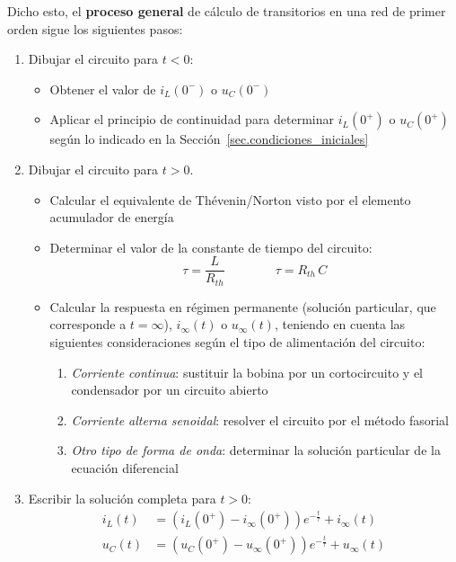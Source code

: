 \documentclass[11pt]{book} %
\begin{document}
	Dicho esto, el \textbf{proceso general} de cálculo de transitorios en una red de primer orden sigue los siguientes pasos:
	\begin{enumerate}
	\item Dibujar el circuito para $t < 0$:
        \begin{itemize}
        \item Obtener el valor de $i_L(0^-)$ o $u_C(0^-)$
        \item Aplicar el principio de continuidad para determinar $i_L(0^+)$ o $u_C(0^+)$ según lo indicado en la Sección~\ref{sec.condiciones_iniciales}
        \end{itemize}
    \item Dibujar el circuito para \(t > 0\).
        \begin{itemize}
        \item Calcular el equivalente de Thévenin/Norton visto por el elemento acumulador de energía
        \item Determinar el valor de la constante de tiempo del circuito:
        \begin{equation*}
            \tau = \dfrac{L}{R_{th}} \qquad\qquad \tau = R_{th}\,{C}
        \end{equation*}
        \item Calcular la respuesta en régimen permanente (solución particular, que corresponde a $t=\infty$), $i_\infty(t)$ o $u_\infty(t)$, teniendo en cuenta las siguientes consideraciones según el tipo de alimentación del circuito:
        \begin{enumerate}
	        \item \textit{Corriente continua}: sustituir la bobina por un cortocircuito y el condensador por un circuito abierto
	        \item \textit{Corriente alterna senoidal}: resolver el circuito por el método fasorial
	        \item \textit{Otro tipo de forma de onda}: determinar la solución particular de la ecuación diferencial
	    \end{enumerate}
        \end{itemize}
    \item Escribir la solución completa para $t>0$:
    \begin{align*}
    i_L(t) &= \left(i_L(0^+) - i_\infty(0^+)\right) e^{-\frac{t}{\tau}} + i_\infty(t)\\
    u_C(t) &= \left(u_C(0^+) - u_\infty(0^+)\right) e^{-\frac{t}{\tau}} + u_\infty(t)\\
    \end{align*}
	\end{enumerate}
	
\end{document}
